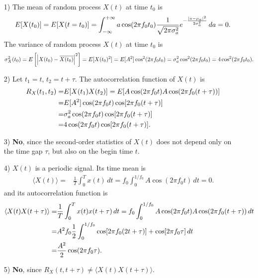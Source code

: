 \documentclass{assignment}
\begin{document}
\begin{sol}
    \begin{itemize}
        \item[1)] The mean of random process $X(t)$ at time $t_0$ is
        \begin{align}
            E[X(t_0)]=E[X(t=t_0)]=\int_{-\infty}^{+\infty}a\cos(2\pi f_0t_0)\frac{1}{\sqrt{2\pi\sigma_a^2}}e^{-\frac{\left\lvert a-\mu_a\right\rvert^2}{2\sigma_a^2}}\,da=0.
        \end{align}
        The variance of random process $X(t)$ at time $t_0$ is
        \begin{align}
            \sigma_X^2(t_0)=E\left[\left\lvert X(t_0)-\overline{X(t_0)}\right\rvert^2\right]=E[X(t_0)^2]=E[A^2]\cos^2(2\pi f_0t_0)=\sigma_a^2\cos^2(2\pi f_0t_0)=4\cos^2(2\pi f_0t_0).
        \end{align}
        \item[2)] Let $t_1=t$, $t_2=t+\tau$. The autocorrelation function of $X(t)$ is
        \begin{align}
            \notag R_X(t_1,t_2)=&E[X(t_1)X(t_2)]=E[A\cos(2\pi f_0t)A\cos(2\pi f_0(t+\tau))]\\
            \notag=&E[A^2]\cos(2\pi f_0t)\cos[2\pi f_0(t+\tau)]\\
            \notag=&\sigma_a^2\cos(2\pi f_0t)\cos[2\pi f_0(t+\tau)]\\
            =&4\cos(2\pi f_0t)\cos[2\pi f_0(t+\tau)].
        \end{align}
        \item[3)] \textbf{No}, since the second-order statistics of $X(t)$ does not depend only on the time gap $\tau$, but also on the begin time $t$.
        \item[4)] $X(t)$ is a periodic signal. Its time mean is
        \begin{align}
            \langle X(t)\rangle=&\frac{1}{T}\int_0^Tx(t)\,dt=f_0\int_0^{1/f_0}A\cos(2\pi f_0t)\,dt=0.
        \end{align}
        and its autocorrelation function is
        \begin{align}
            \notag\langle X(t)X(t+\tau)\rangle=&\frac{1}{T}\int_0^Tx(t)x(t+\tau)\,dt=f_0\int_0^{1/f_0}A\cos(2\pi f_0t)A\cos(2\pi f_0(t+\tau))\,dt\\
            \notag=&A^2f_0\frac{1}{2}\int_0^{1/f_0}\cos[2\pi f_0(2t+\tau)]+\cos[2\pi f_0\tau]\,dt\\
            =&\frac{A^2}{2}\cos(2\pi f_0\tau).
        \end{align}
        \item[5)] \textbf{No}, since $R_X(t,t+\tau)\neq\langle X(t)X(t+\tau)\rangle$.
    \end{itemize}
\end{sol}
\end{document}
